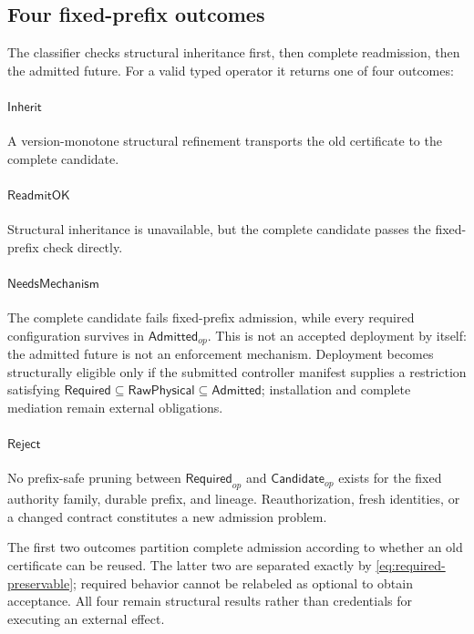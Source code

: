 \subsection{Four fixed-prefix outcomes}

The classifier checks structural inheritance first, then complete
readmission, then the admitted future.  For a valid typed operator
it returns one of four outcomes:
\paragraph{$\mathsf{Inherit}$}
A version-monotone structural refinement transports the old certificate to
the complete candidate.

\paragraph{$\mathsf{ReadmitOK}$}
Structural inheritance is unavailable, but the complete candidate passes the
fixed-prefix check directly.

\paragraph{$\mathsf{NeedsMechanism}$}
The complete candidate fails fixed-prefix admission, while every required
configuration survives in $\mathsf{Admitted}_{op}$.  This is not an accepted
deployment by itself: the admitted future is not an enforcement mechanism.
Deployment becomes structurally eligible only if the submitted controller
manifest supplies a restriction satisfying
$\mathsf{Required}\subseteq\mathsf{RawPhysical}\subseteq\mathsf{Admitted}$;
installation and complete mediation remain external obligations.

\paragraph{$\mathsf{Reject}$}
No prefix-safe pruning between $\mathsf{Required}_{op}$ and
$\mathsf{Candidate}_{op}$ exists for the fixed authority family, durable
prefix, and lineage.  Reauthorization, fresh identities, or a changed contract
constitutes a new admission problem.

The first two outcomes partition complete admission according to whether an
old certificate can be reused.  The latter two are separated exactly by
\cref{eq:required-preservable}; required behavior cannot be relabeled as
optional to obtain acceptance.  All four remain structural results rather
than credentials for executing an external effect.


